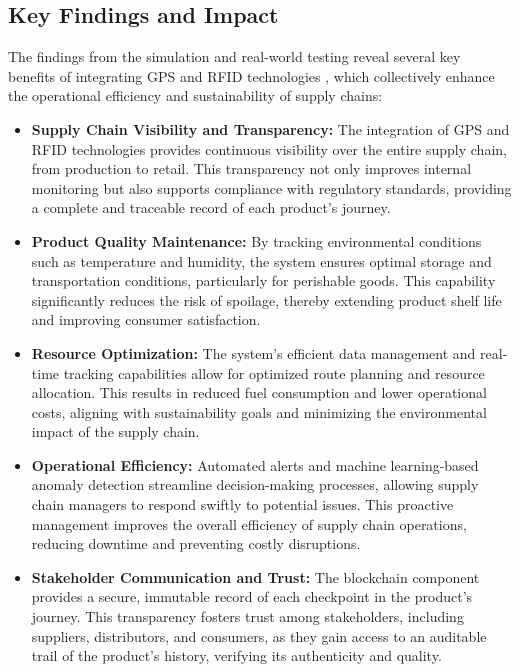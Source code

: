 \documentclass[conference]{IEEEtran}
\begin{document}
\subsection{Key Findings and Impact}
The findings from the simulation and real-world testing reveal several key benefits of integrating GPS and RFID technologies \cite{hernandez2024implementation, al2021prochain}, which collectively enhance the operational efficiency and sustainability of supply chains:

\begin{itemize}
\item \textbf{Supply Chain Visibility and Transparency:} The integration of GPS and RFID technologies provides continuous visibility over the entire supply chain, from production to retail. This transparency not only improves internal monitoring but also supports compliance with regulatory standards, providing a complete and traceable record of each product's journey.

\item \textbf{Product Quality Maintenance:} By tracking environmental conditions such as temperature and humidity, the system ensures optimal storage and transportation conditions, particularly for perishable goods. This capability significantly reduces the risk of spoilage, thereby extending product shelf life and improving consumer satisfaction.

\item \textbf{Resource Optimization:} The system's efficient data management and real-time tracking capabilities allow for optimized route planning and resource allocation. This results in reduced fuel consumption and lower operational costs, aligning with sustainability goals and minimizing the environmental impact of the supply chain.

\item \textbf{Operational Efficiency:} Automated alerts and machine learning-based anomaly detection streamline decision-making processes, allowing supply chain managers to respond swiftly to potential issues. This proactive management improves the overall efficiency of supply chain operations, reducing downtime and preventing costly disruptions.

\item \textbf{Stakeholder Communication and Trust:} The blockchain component provides a secure, immutable record of each checkpoint in the product's journey. This transparency fosters trust among stakeholders, including suppliers, distributors, and consumers, as they gain access to an auditable trail of the product's history, verifying its authenticity and quality.

\end{itemize}
\end{document}
